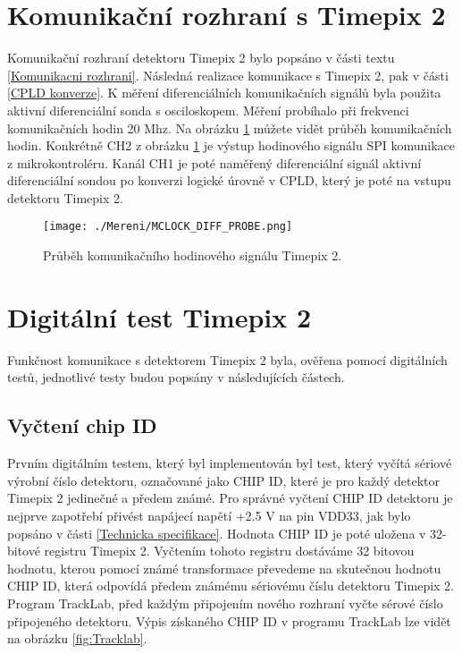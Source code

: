 \section{Komunikační rozhraní s Timepix 2}		%
Komunikační rozhraní detektoru Timepix 2 bylo popsáno v části textu \ref{Komunikacni rozhrani}. Následná  realizace komunikace s Timepix 2, pak v části \ref{CPLD konverze}. K měření diferenciálních komunikačních signálů byla použita aktivní diferenciální sonda s osciloskopem. Měření probíhalo při frekvenci komunikačních hodin 20 Mhz. Na obrázku \ref{fig:MCLOCK_DIFF_PROBE} můžete vidět průběh komunikačních hodin. Konkrétně CH2 z obrázku \ref{fig:MCLOCK_DIFF_PROBE} je výstup hodinového signálu SPI komunikace z mikrokontroléru. Kanál CH1 je poté naměřený diferenciální signál aktivní diferenciální sondou po konverzi logické úrovně v CPLD, který je poté na vstupu detektoru Timepix 2.  
\begin{figure}[h!]
	\centering
	\captionsetup{justification=centering}
	\texttt{[image: ./Mereni/MCLOCK\_DIFF\_PROBE.png]}
	\caption{Průběh komunikačního hodinového signálu Timepix 2.} 
	\label{fig:MCLOCK_DIFF_PROBE}
\end{figure}

\section{Digitální test Timepix 2} %
Funkčnost komunikace s detektorem Timepix 2 byla, ověřena pomocí digitálních testů, jednotlivé testy budou popsány v následujících částech.
	\subsection{Vyčtení chip ID}
	Prvním digitálním testem, který byl implementován byl test, který vyčítá sériové výrobní číslo detektoru, označované jako CHIP ID, které je pro každý detektor Timepix 2 jedinečné a předem známé. Pro správné vyčtení CHIP ID detektoru je nejprve zapotřebí přivést napájecí napětí +2.5 V na pin VDD33, jak bylo popsáno v části \ref{Technicka specifikace}. Hodnota CHIP ID je poté uložena v 32-bitové registru Timepix 2. Vyčtením tohoto registru dostáváme 32 bitovou hodnotu, kterou pomocí známé transformace převedeme na skutečnou hodnotu CHIP ID, která odpovídá předem známému sériovému číslu detektoru Timepix 2. Program TrackLab, před každým připojením nového rozhraní vyčte sérové číslo připojeného detektoru. Výpis získaného CHIP ID v programu TrackLab lze vidět na obrázku \ref{fig:Tracklab}.


